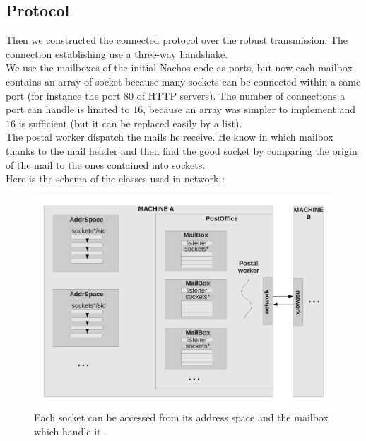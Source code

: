 \subsection{Protocol}
Then we constructed the connected protocol over the robust transmission.
The connection establishing use a three-way handshake.\\
We use the mailboxes of the initial Nachos code as ports, but now each mailbox contains an array of 
socket because many sockets can be connected within a same port (for instance the
port $80$ of HTTP servers).  The number of connections a port can handle is limited 
to $16$, because an array was simpler to implement and $16$ is sufficient (but it 
can be replaced easily by a list).\\
The postal worker dispatch the mails he receive. He know in which mailbox
thanks to the mail header and then find the good socket by comparing the origin
of the mail to the ones contained into sockets.\\
Here is the schema of the classes used in network :
\begin{figure}[H]
	\centering
		\includegraphics[scale=0.4]{networkschema}
		\caption{Each socket can be accessed from its address space and the mailbox which handle it.}
\end{figure}
